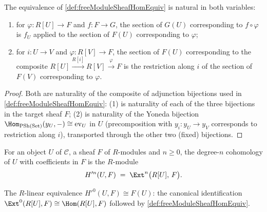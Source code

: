 \begin{lemma}
  \label{lem:freeModuleSheafHomEquiv_naturality}
  \leanok
  The equivalence of \ref{def:freeModuleSheafHomEquiv} is natural in both variables:
  \begin{enumerate}
    \item for \(\varphi : R[U] \to F\) and \(f : F \to G\), the section of \(G(U)\)
      corresponding to \(f \circ \varphi\) is \(f_U\) applied to the section of \(F(U)\)
      corresponding to \(\varphi\);
    \item for \(i : U \to V\) and \(\varphi : R[V] \to F\), the section of \(F(U)\)
      corresponding to the composite \(R[U] \xrightarrow{R[i]} R[V] \xrightarrow{\varphi} F\)
      is the restriction along \(i\) of the section of \(F(V)\) corresponding to \(\varphi\).
  \end{enumerate}
\end{lemma}
\begin{proof}
  \leanok
  Both are naturality of the composite of adjunction bijections used in
  \ref{def:freeModuleSheafHomEquiv}: (1) is naturality of each of the three bijections in
  the target sheaf \(F\); (2) is naturality of the Yoneda bijection
  \(\Hom_{\mathrm{PSh}(\mathrm{Set})}(y_U,-) \cong \mathrm{ev}_U\) in \(U\) (precomposition
  with \(y_i : y_U \to y_V\) corresponds to restriction along \(i\)), transported through the
  other two (fixed) bijections.
\end{proof}

\begin{definition}
  \label{def:HModule'}
  \leanok
  For an object \(U\) of \(\mathcal C\), a sheaf \(F\) of \(R\)-modules and \(n \ge 0\), the
  degree-\(n\) cohomology of \(U\) with coefficients in \(F\) is the \(R\)-module
  \[
    H'^n(U, F) \;=\; \Ext^n\bigl(R[U],\, F\bigr).
  \]
\end{definition}

\begin{definition}
  \label{def:HModule'_linearEquiv0}
  \leanok
  The \(R\)-linear equivalence \(H'^0(U, F) \cong F(U)\): the canonical identification
  \(\Ext^0(R[U], F) \cong \Hom(R[U], F)\) followed by \ref{def:freeModuleSheafHomEquiv}.
\end{definition}

